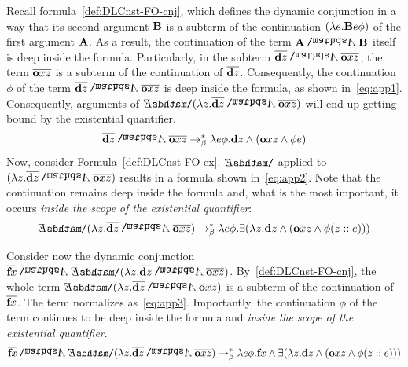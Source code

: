 Recall formula~\eqref{def:DLCnst-FO-cnj}, which defines the dynamic conjunction in a way that its second argument $\B2$ is a subterm of the continuation $(\lambda e. \B2 e \phi)$ of the first argument $\A2$. As a result, the continuation of the term $\A2 \cnj2 \B2$ itself is deep inside the formula. Particularly, in the subterm $ \tr{\cdonkey \z1}\cnj2 \tr{\cown \x1 \z1} $, the term $\tr{\cown \x1 \z1}$ is a subterm of the continuation of $\tr{\cdonkey \z1}$. Consequently, the continuation $\phi$ of the term $\tr{\cdonkey \z1}\cnj2 \tr{\cown \x1 \z1}$ is deep inside the formula, as shown in~\eqref{eq:app1}.  
Consequently, arguments of $ \ex2 (\lambda \z1.  \tr{\cdonkey \z1}\cnj2 \tr{\cown \x1 \z1}  ) $ will end up getting bound by the existential quantifier.
\begin{align}
\tr{\cdonkey \z1}\cnj2 \tr{\cown \x1 \z1} \bred  \lambda e \phi. \cdonkey \z1 \cnj1 ( \cown \x1  \z1 \cnj1 \phi e)  \label{eq:app1}
\end{align}
 Now, consider Formula~\eqref{def:DLCnst-FO-ex}. $\ex2$ applied to $ ( \lambda \z1. \tr{\cdonkey \z1}\cnj2 \tr{\cown \x1 \z1})$ results in a formula shown in~\eqref{eq:app2}. Note that the continuation remains deep inside the formula and, what is the most important, it occurs \emph{inside the scope of the existential quantifier}:
 \begin{align}
 \ex2 (\lambda \z1.  \tr{\cdonkey \z1}\cnj2 \tr{\cown \x1 \z1}  ) \bred  \lambda e \phi. \ex1 ( \lambda \z1. \cdonkey \z1  \cnj1 ( \cown \x1 \z1 \cnj1 \phi (\z1::e)) )  \label{eq:app2}
 \end{align}

Consider now the dynamic conjunction $ \tr{\cfarmer \x1}  \cnj2 \ex2 (\lambda \z1.  \tr{\cdonkey \z1}\cnj2 \tr{\cown \x1 \z1}  )$. By~\eqref{def:DLCnst-FO-cnj}, the whole term $\ex2 (\lambda \z1.  \tr{\cdonkey \z1}\cnj2 \tr{\cown \x1 \z1}  ) $ is a subterm of the continuation of $\tr{\cfarmer \x1} $. The term normalizes as~\eqref{eq:app3}. Importantly, the continuation $\phi$ of the term continues to be deep inside the formula and \emph{inside} \emph{the scope of the existential quantifier}.
\begin{align}
 \tr{\cfarmer \x1}  \cnj2 \ex2 (\lambda \z1.  \tr{\cdonkey \z1}\cnj2 \tr{\cown \x1 \z1}  )  \bred  \lambda e \phi. \cfarmer \x1  \cnj1 \ex1 ( \lambda \z1. \cdonkey \z1  \cnj1 ( \cown \x1  \z1 \cnj1 \phi  (\z1::e) ) )  \label{eq:app3}
\end{align}

